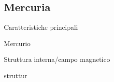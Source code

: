 \subsection{Mercuria}

\begin{frame}{Caratteristiche principali}

\end{frame}

\begin{wordonframe}{Mercurio}

\end{wordonframe}

\begin{frame}{Struttura interna/campo magnetico}

\end{frame}

\begin{wordonframe}{struttur}

\end{wordonframe}
